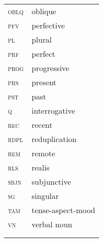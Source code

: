 \documentclass[output=paper]{langsci/langscibook}
\begin{document}
\begin{tabularx}{.33\textwidth}{ll}
\textsc{oblq}  & oblique  \\
\textsc{pfv}  & perfective  \\
\textsc{pl}  & plural\\
\textsc{prf}  & perfect  \\
\textsc{prog}  & progressive \\ 
\textsc{prs}  & present\\
\textsc{pst}  & past  \\
\textsc{q}  & interrogative\\  
\textsc{rec}  & recent\\
\textsc{rdpl}  &reduplication  \\
\textsc{rem}  & remote  \\
\textsc{rls}  & realis\\
\textsc{sbjn}  & subjunctive\\  
\textsc{sg}  & singular  \\
\textsc{tam}  & tense-aspect-mood \textsc{}\\
\textsc{vn    }   & verbal noun\\
\\
\\
\end{tabularx}
\end{document}
